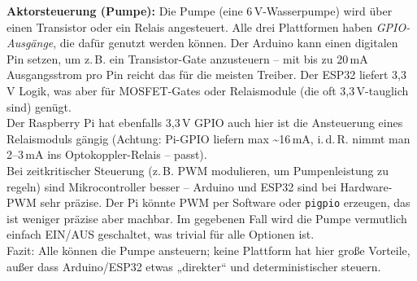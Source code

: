 \vspace{5mm}

\noindent\textbf{Aktorsteuerung (Pumpe):} Die Pumpe (eine  6\,V-Wasserpumpe) wird über einen Transistor oder ein Relais angesteuert. Alle drei Plattformen haben \textit{GPIO-Ausgänge}, die dafür genutzt werden können. Der Arduino kann einen digitalen Pin setzen, um z.\,B. ein Transistor-Gate anzusteuern – mit bis zu 20\,mA Ausgangsstrom pro Pin \autocite{atmega_datasheet} reicht das für die meisten Treiber. Der ESP32 liefert 3{,}3\,V Logik, was aber für MOSFET-Gates oder Relaismodule (die oft 3{,}3\,V-tauglich sind) genügt. \autocite{atmega_datasheet} 
\\
Der Raspberry Pi hat ebenfalls 3{,}3\,V GPIO \autocite{raspberry_pi_datasheet} auch hier ist die Ansteuerung eines Relaismoduls gängig (Achtung: Pi-GPIO liefern max \textasciitilde16\,mA, i.\,d.\,R. nimmt man 2–3\,mA ins Optokoppler-Relais – passt). 
\\
Bei zeitkritischer Steuerung (z.\,B. PWM modulieren, um Pumpenleistung zu regeln) sind Mikrocontroller besser – Arduino und ESP32 sind bei Hardware-PWM sehr präzise. Der Pi könnte PWM per Software oder \texttt{pigpio} erzeugen, das ist weniger präzise aber machbar. Im gegebenen Fall wird die Pumpe vermutlich einfach EIN/AUS geschaltet, was trivial für alle Optionen ist.
\\
Fazit: Alle können die Pumpe ansteuern; keine Plattform hat hier große Vorteile, außer dass Arduino/ESP32 etwas „direkter“ und deterministischer steuern.


\vspace{5mm}

